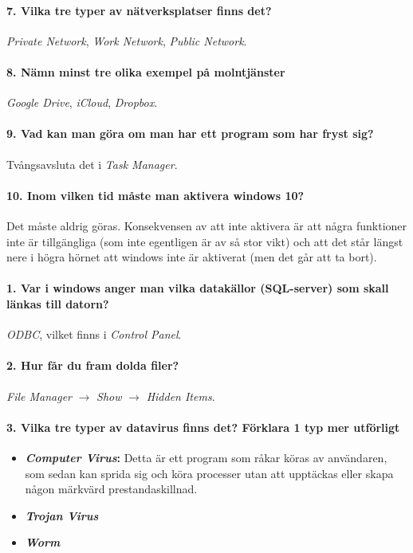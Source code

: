 \paragraph{7. Vilka tre typer av nätverksplatser finns det?}
\textit{Private Network}, \textit{Work Network}, \textit{Public Network}.

\paragraph{8. Nämn minst tre olika exempel på molntjänster}
\textit{Google Drive}, \textit{iCloud}, \textit{Dropbox}.

\paragraph{9. Vad kan man göra om man har ett program som har fryst sig?}
Tvångsavsluta det i \textit{Task Manager}.

\paragraph{10. Inom vilken tid måste man aktivera windows 10?}
Det måste aldrig göras. Konsekvensen av att inte aktivera är att några funktioner inte är tillgängliga (som inte egentligen är av så stor vikt) och att det står längst nere i högra hörnet att windows inte är aktiverat (men det går att ta bort).

\dotfill

\paragraph{1. Var i windows anger man vilka datakällor (SQL-server) som skall länkas till datorn?}
\textit{ODBC}, vilket finns i \textit{Control Panel}.

\paragraph{2. Hur får du fram dolda filer?}
\textit{File Manager} $\rightarrow$ \textit{Show} $\rightarrow$ \textit{Hidden Items}.

\paragraph{3. Vilka tre typer av datavirus finns det? Förklara 1 typ mer utförligt}

\begin{itemize}
	\item \textbf{\textit{Computer Virus}:} Detta är ett program som råkar köras av användaren, som sedan kan sprida sig och köra processer utan att upptäckas eller skapa någon märkvärd prestandaskillnad.
	\item \textit{\textbf{Trojan Virus}}
	\item \textit{\textbf{Worm}}
\end{itemize}

